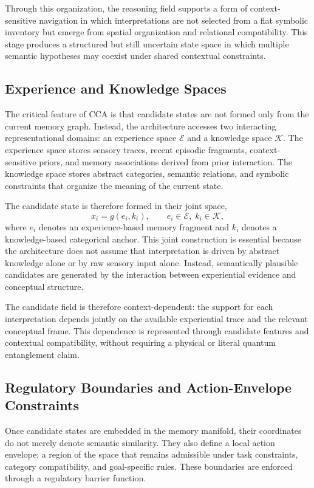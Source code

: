 \documentclass[10pt,journal,compsoc]{IEEEtran}
\begin{document}
Through this organization, the reasoning field supports a form of context-sensitive navigation in which interpretations are not selected from a flat symbolic inventory but emerge from spatial organization and relational compatibility. This stage produces a structured but still uncertain state space in which multiple semantic hypotheses may coexist under shared contextual constraints.

\subsection{Experience and Knowledge Spaces}

The critical feature of CCA is that candidate states are not formed only from the current memory graph. Instead, the architecture accesses two interacting representational domains: an experience space $\mathcal{E}$ and a knowledge space $\mathcal{K}$. The experience space stores sensory traces, recent episodic fragments, context-sensitive priors, and memory associations derived from prior interaction. The knowledge space stores abstract categories, semantic relations, and symbolic constraints that organize the meaning of the current state.

The candidate state is therefore formed in their joint space,
\[
x_i = g(e_i, k_i), \qquad e_i \in \mathcal{E},\; k_i \in \mathcal{K},
\]
where $e_i$ denotes an experience-based memory fragment and $k_i$ denotes a knowledge-based categorical anchor. This joint construction is essential because the architecture does not assume that interpretation is driven by abstract knowledge alone or by raw sensory input alone. Instead, semantically plausible candidates are generated by the interaction between experiential evidence and conceptual structure.

The candidate field is therefore context-dependent: the support for each interpretation depends jointly on the available experiential trace and the relevant conceptual frame. This dependence is represented through candidate features and contextual compatibility, without requiring a physical or literal quantum entanglement claim.

\subsection{Regulatory Boundaries and Action-Envelope Constraints}

Once candidate states are embedded in the memory manifold, their coordinates do not merely denote semantic similarity. They also define a local action envelope: a region of the space that remains admissible under task constraints, category compatibility, and goal-specific rules. These boundaries are enforced through a regulatory barrier function.
\end{document}
